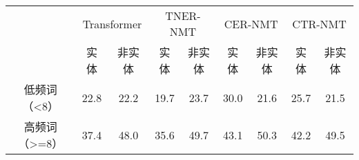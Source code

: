 
\begin{table}[!htbp]
    \label{tab:4_freq_acc}
    \centering
    \footnotesize%
    \setlength{\tabcolsep}{4pt}%
    \renewcommand{\arraystretch}{1.2}%
    \begin{tabular}{c|cc|cc|cc|cc}
    \hline
    & \multicolumn{2}{c}{Transformer} & \multicolumn{2}{c}{TNER-NMT} & \multicolumn{2}{c}{CER-NMT} & \multicolumn{2}{c}{CTR-NMT} \\\cline{2-9}
      & 实体 & 非实体 & 实体 & 非实体 & 实体 & 非实体 & 实体 & 非实体 \\\hline
    低频词（<8） & 22.8 & 22.2 & 19.7 & 23.7 & 30.0 & 21.6 & 25.7 & 21.5 \\
    高频词（>=8）& 37.4 & 48.0 & 35.6 & 49.7 & 43.1 & 50.3 & 42.2 & 49.5 \\
     \hline
    \end{tabular}%
\end{table}%
